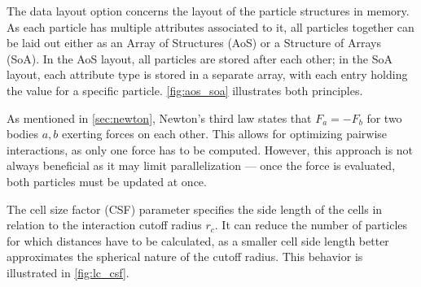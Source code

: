 \begin{description}[leftmargin=!,labelwidth=\widthof{\textbf{Cell Size Factor}}]
	\item[\textbf{Data Layout}] The data layout option concerns the layout of the particle structures in memory. As each particle has multiple attributes associated to it, all particles together can be laid out either as an Array of Structures (AoS) or a Structure of Arrays (SoA). In the AoS layout, all particles are stored after each other; in the SoA layout, each attribute type is stored in a separate array, with each entry holding the value for a specific particle. \autoref{fig:aos_soa} illustrates both principles.
	\item[\textbf{Newton3}] As mentioned in \autoref{sec:newton}, Newton's third law states that $F_a = -F_b$ for two bodies $a, b$ exerting forces on each other. This allows for optimizing pairwise interactions, as only one force has to be computed. However, this approach is not always beneficial as it may limit parallelization --- once the force is evaluated, both particles must be updated at once.
	\item[\textbf{Cell Size Factor}] The cell size factor (CSF) parameter specifies the side length of the cells in relation to the interaction cutoff radius $r_c$. It can reduce the number of particles for which distances have to be calculated, as a smaller cell side length better approximates the spherical nature of the cutoff radius. This behavior is illustrated in  \autoref{fig:lc_csf}.
\end{description}

